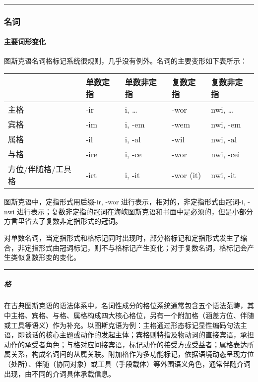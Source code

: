 \documentclass{article}
\begin{document}
\begin{center}\rule{0.5\linewidth}{0.5pt}\end{center}

\subsubsection{名词}\label{ux540dux8bcd}

\paragraph{主要词形变化}\label{ux4e3bux8981ux8bcdux5f62ux53d8ux5316}

图斯克语名词格标记系统很规则，几乎没有例外。名词的主要变形如下表所示：

\begin{longtable}[]{@{}lllll@{}}
\toprule\noalign{}
& 单数定指 & 单数非定指 & 复数定指 & 复数非定指 \\
\midrule\noalign{}
\endhead
\bottomrule\noalign{}
\endlastfoot
主格 & -ir & i, \ldots{} & -wor & nwi, \ldots{} \\
宾格 & -im & i, -em & -wem & nwi, -em \\
属格 & -il & i, -al & -wil & nwi, -al \\
与格 & -ire & i, -ce & -wor & nwi, -cei \\
方位/伴随格/工具格 & -irt & i, -it & -wor (it) & nwi, -it \\
\end{longtable}

图斯克语中，定指形式用后缀-ir, -wor
进行表示，相对的，非定指形式由冠词-i, -nwi
进行表示；复数非定指的冠词在海峡图斯克语和书面中是必须的，但是小部分方言里省去了复数非定指形式的冠词。

对单数名词，当定指形式和格标记同时出现时，部分格标记和定指形式发生了缩合，非定指形式由冠词标记，则不与格标记产生变化；对于复数名词，格标记会产生类似复数形变的变化。

\begin{center}\rule{0.5\linewidth}{0.5pt}\end{center}

\subparagraph{格}\label{ux683c}

在古典图斯克语的语法体系中，名词性成分的格位系统通常包含五个语法范畴，其中主格、宾格、与格、属格构成四大核心格位，另有一个附加格（涵盖方位、伴随或工具等语义）作为补充。以图斯克语为例：主格通过形态标记显性编码句法主语，即谈话的核心主题或动作的发起主体；宾格则特指及物动词的直接宾语，承担动作的承受者角色；与格对应间接宾语，标记动作的接受方或受益者；属格表达所属关系，构成名词间的从属关联。附加格作为多功能标记，依据语境动态呈现方位（处所）、伴随（协同对象）或工具（手段载体）等外围语义角色，通常伴随介词出现，由不同的介词具体承载信息。
\end{document}
